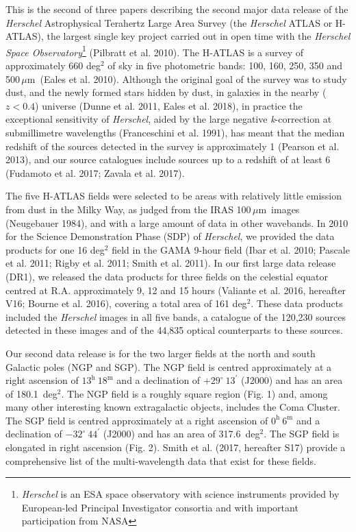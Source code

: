 \documentclass[a4paper,fleqn,usenatbib, twocolumn]{aastex61}
\def\mic{\,$\mu $m}
\begin{document}
This is the second of three papers describing the second major data
release of the {\it Herschel} Astrophysical Terahertz Large Area
Survey (the {\it Herschel} ATLAS or H-ATLAS), the largest single key
project carried out in open time with the {\it Herschel Space
  Observatory}\footnote{{\it Herschel} is an ESA space observatory with
  science instruments provided by European-led Principal Investigator
  consortia and with important participation from NASA} (Pilbratt et
al.  2010).  The H-ATLAS is a survey of approximately 660 deg$^2$ of
sky in five photometric bands: 100, 160, 250, 350 and 500\mic\
(Eales et al.  2010).  Although the original goal of the survey was to
study dust, and the newly formed stars hidden by dust, in galaxies in
the nearby ($z<0.4$) universe (Dunne et al. 2011, Eales et al. 2018),
in practice the exceptional sensitivity of {\it Herschel}, aided by
the large negative {\it k}-correction at submillimetre wavelengths
(Franceschini et al. 1991), has meant that the median redshift of the
sources detected in the survey is approximately 1 (Pearson et
al. 2013), and our source catalogues include sources up to a redshift
of at least 6 (Fudamoto et al. 2017; Zavala et al. 2017).

The five H-ATLAS fields were selected to be areas with relatively
little emission from dust in the Milky Way, as judged from the IRAS
100\mic\ images (Neugebauer 1984), and with a large amount of data
in other wavebands. In 2010 for the Science Demonstration Phase (SDP)
of {\it Herschel}, we provided the data products for one 16 deg$^2$
field in the GAMA 9-hour field (Ibar et al. 2010; Pascale et al. 2011;
Rigby et al. 2011; Smith et al. 2011).  In our first large data
release (DR1), we released the data products for three fields on the
celestial equator centred at R.A. approximately 9, 12 and 15 hours
(Valiante et al. 2016, hereafter V16; Bourne et al.  2016), covering a total area of
161 deg$^2$.  These data products included the {\it Herschel} images
in all five bands, a catalogue of the 120,230 sources detected in
these images and of the 44,835 optical counterparts to these sources.

Our second data release is for the two larger fields at the north and
south Galactic poles (NGP and SGP). The NGP field is centred
approximately at a right ascension of
$13^{\mathrm{h}}\ 18^{\mathrm{m}}$ and a declination of
$+29^{\circ}\ 13^{\prime}$ (J2000) and has an area of 180.1~deg$^2$.
The NGP field is a roughly square region (Fig. 1) and, among many
other interesting known extragalactic objects, includes the Coma
Cluster.  The SGP field is centred approximately at a right ascension
of $ 0^{\mathrm{h}}\ 6^{\mathrm{m}}$ and a declination of
$-32^{\circ} \ 44^{\prime}$ (J2000) and has an area of
317.6~deg$^2$. The SGP field is elongated in right ascension (Fig. 2).
Smith et al. (2017, hereafter S17) provide a comprehensive list of the
multi-wavelength data that exist for these fields.
\end{document}
